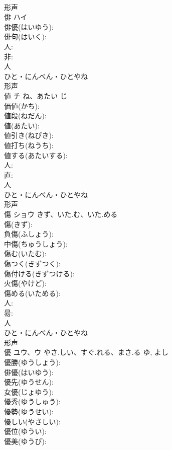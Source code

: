 \documentclass[8pt]{extreport}
\begin{document}
\begin{CJK}{UTF8}{min}
\\	形声 
\\	俳	ハイ			
\\	俳優(はいゆう): 
\\	俳句(はいく): 
\\	人: 
\\	非: 
\\	人	
\\	ひと・にんべん・ひとやね	
\\	形声 
\\	値	チ	ね、あたい	じ	
\\	価値(かち): 
\\	値段(ねだん): 
\\	値(あたい): 
\\	値引き(ねびき): 
\\	値打ち(ねうち): 
\\	値する(あたいする): 
\\	人: 
\\	直: 
\\	人	
\\	ひと・にんべん・ひとやね	
\\	形声 
\\	傷	ショウ	きず、いた.む、いた.める		
\\	傷(きず): 
\\	負傷(ふしょう): 
\\	中傷(ちゅうしょう): 
\\	傷む(いたむ): 
\\	傷つく(きずつく): 
\\	傷付ける(きずつける): 
\\	火傷(やけど): 
\\	傷める(いためる): 
\\	人: 
\\	昜: 
\\	人	
\\	ひと・にんべん・ひとやね	
\\	形声 
\\	優	ユウ、ウ	やさ.しい、すぐ.れる、まさ.る	ゆ, よし	
\\	優勝(ゆうしょう): 
\\	俳優(はいゆう): 
\\	優先(ゆうせん): 
\\	女優(じょゆう): 
\\	優秀(ゆうしゅう): 
\\	優勢(ゆうせい): 
\\	優しい(やさしい): 
\\	優位(ゆうい): 
\\	優美(ゆうび): 

\end{CJK}
\end{document}
